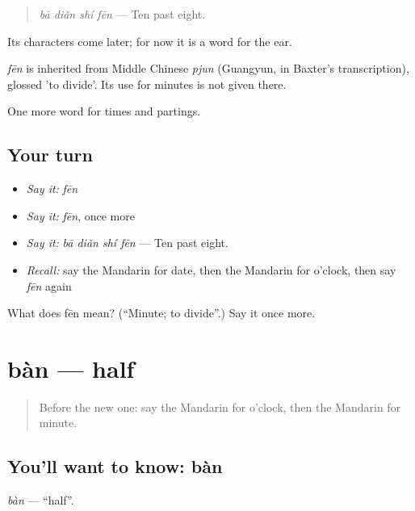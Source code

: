 \begin{quote}
\emph{bā diǎn shí fēn} — Ten past eight.
\end{quote}

Its characters come later; for now it is a word for the ear.

\begin{cousinweb}
\emph{fēn} is inherited from Middle Chinese \emph{pjun} (Guangyun, in Baxter's transcription), glossed 'to divide'. Its use for minutes is not given there.
\end{cousinweb}

\begin{grammarlens}[title={What you've built}]
One more word for times and partings.
\end{grammarlens}

\subsection*{Your turn}
\begin{itemize}
\raggedright
  \item \emph{Say it:} \emph{fēn}
  \item \emph{Say it:} \emph{fēn}, once more
  \item \emph{Say it:} \emph{bā diǎn shí fēn} — Ten past eight.
  \item \emph{Recall:} say the Mandarin for date, then the Mandarin for o'clock, then say \emph{fēn} again
\end{itemize}

\begin{tcolorbox}[breakable,colback=teal!4,colframe=teal!35!black,title={Before you move on}]
What does fēn mean? (\textquotedblleft{}Minute; to divide\textquotedblright{}.) Say it once more.
\end{tcolorbox}
\section[bàn]{bàn — half}

\label{lesson:ZH-C48-ban}



\begin{quote}
Before the new one: say the Mandarin for o'clock, then the Mandarin for minute.
\end{quote}

\subsection*{You'll want to know: bàn}
\emph{bàn} — \textquotedblleft{}half\textquotedblright{}.

